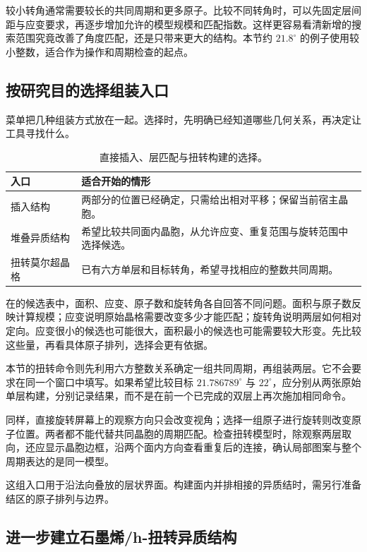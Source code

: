 较小转角通常需要较长的共同周期和更多原子。比较不同转角时，可以先固定层间距与应变要求，再逐步增加允许的模型规模和匹配指数。这样更容易看清新增的搜索范围究竟改善了角度匹配，还是只带来更大的结构。本节约 $21.8^\circ$ 的例子使用较小整数，适合作为操作和周期检查的起点。

\subsection{按研究目的选择组装入口}

菜单把几种组装方式放在一起。选择时，先明确已经知道哪些几何关系，再决定让工具寻找什么。

\begin{table}[htbp]
\centering
\caption{直接插入、层匹配与扭转构建的选择。}
\begin{tabularx}{\linewidth}{lX}
\toprule
入口 & 适合开始的情形\\
\midrule
插入结构 & 两部分的位置已经确定，只需给出相对平移；保留当前宿主晶胞。\\
堆叠异质结构 & 希望比较共同面内晶胞，从允许应变、重复范围与旋转范围中选择候选。\\
扭转莫尔超晶格 & 已有六方单层和目标转角，希望寻找相应的整数共同周期。\\
\bottomrule
\end{tabularx}
\end{table}

在的候选表中，面积、应变、原子数和旋转角各自回答不同问题。面积与原子数反映计算规模；应变说明原始晶格需要改变多少才能匹配；旋转角说明两层如何相对定向。应变很小的候选也可能很大，面积最小的候选也可能需要较大形变。先比较这些量，再看具体原子排列，选择会更有依据。

本节的扭转命令则先利用六方整数关系确定一组共同周期，再组装两层。它不会要求在同一个窗口中填写。如果希望比较目标 $21.786789^\circ$ 与 $22^\circ$，应分别从两张原始单层构建，分别记录结果，而不是在前一个已完成的双层上再次施加相同命令。

同样，直接旋转屏幕上的观察方向只会改变视角；选择一组原子进行旋转则改变原子位置。两者都不能代替共同晶胞的周期匹配。检查扭转模型时，除观察两层取向，还应显示晶胞边框，沿两个面内方向查看重复后的连接，确认局部图案与整个周期表达的是同一模型。

这组入口用于沿法向叠放的层状界面。构建面内并排相接的异质结时，需另行准备结区的原子排列与边界。

\subsection{进一步建立石墨烯/h-扭转异质结构}

